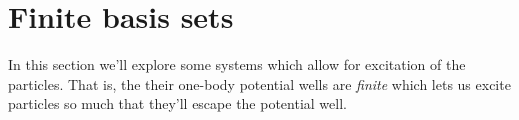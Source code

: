 \section{Finite basis sets}
    In this section we'll explore some systems which allow for excitation of the
    particles. That is, the their one-body potential wells are \emph{finite}
    which lets us excite particles so much that they'll escape the potential
    well.
